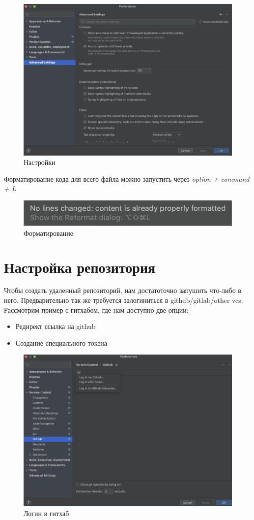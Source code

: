 \documentclass[12pt, a4paper]{article}
\begin{document}
    \begin{figure}[H]
        \centering
        \includegraphics[width=0.75\linewidth]{src/preferences.png}
        \caption{Настройки}
    \end{figure}

    Форматирование кода для всего файла можно запустить через \textit{option + command + L}

    \begin{figure}[H]
        \centering
        \includegraphics[width=0.75\linewidth]{src/format.png}
        \caption{Форматирование}
    \end{figure}
    

    \newpage
    \section{Настройка репозитория}
    
    Чтобы создать удаленный репозиторий, нам достатоточно запушить что-либо в него.
    Предварительно так же требуется залогиниться в github/gitlab/other vcs.
    Рассмотрим пример с гитхабом, где нам доступно две опции:
    
    \begin{itemize}
        \item Редирект ссылка на github
        \item Создание специального токена
    \end{itemize}

    \begin{figure}[H]
        \centering
        \includegraphics[width=0.75\linewidth]{src/login.png}
        \caption{Логин в гитхаб}
    \end{figure}
\end{document}
